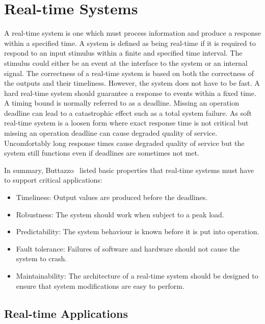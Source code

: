 \section{Real-time Systems}
\label{sec:bg_realtime}

A real-time system is one which must process information and produce a response within a specified time. %
A system is defined as being real-time if it is required to respond to an input stimulus within a finite and specified time interval.
The stimulus could either be an event at the interface to the system or an internal signal.
The correctness of a real-time system is based on both the correctness of the outputs and their timeliness.
However, the system does not have to be fast.
A hard real-time system should guarantee a response to events within a fixed time.
A timing bound is normally referred to as a deadline.
Missing an operation deadline can lead to a catastrophic effect such as a total system failure. 
As soft real-time system is a loosen form where exact response time is not critical but missing an operation deadline can cause degraded quality of service.
Uncomfortably long response times cause degraded quality of service but the system still functions even if deadlines are sometimes not met.

In summary, Buttazzo~\cite{buttazzo11} listed basic properties that real-time systems must have to support critical applications:
\begin{itemize}
\item Timeliness: Output values are produced before the deadlines.
\item Robustness: The system should work when subject to a peak load.
\item Predictability: The system behaviour is known before it is put into operation.
\item Fault tolerance: Failures of software and hardware should not cause the system to crash.
\item Maintainability: The architecture of a real-time system should be designed to ensure that system modifications are easy to perform.
\end{itemize}

\subsection{Real-time Applications}

